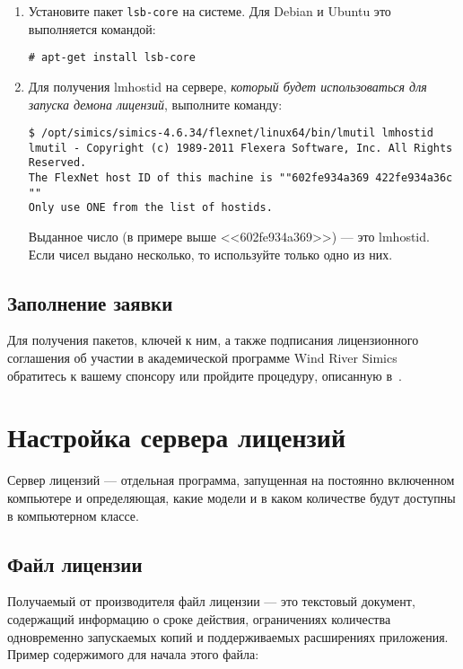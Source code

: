 \begin{enumerate}
    \item Установите пакет \texttt{lsb-core} на системе. Для Debian и Ubuntu это выполняется командой:
    
    \texttt{\# apt-get install lsb-core}
         
    \item Для получения lmhostid на сервере, \textit{который будет использоваться для запуска демона лицензий}, выполните команду:
    
\begin{lstlisting}
$ /opt/simics/simics-4.6.34/flexnet/linux64/bin/lmutil lmhostid
lmutil - Copyright (c) 1989-2011 Flexera Software, Inc. All Rights Reserved.
The FlexNet host ID of this machine is ""602fe934a369 422fe934a36c ""
Only use ONE from the list of hostids.
\end{lstlisting}

Выданное число (в примере выше <<602fe934a369>>) --- это lmhostid. Если чисел выдано несколько, то используйте только одно из них.
    
\end{enumerate}

\subsection{Заполнение заявки}

Для получения пакетов, ключей к ним, а также подписания лицензионного соглашения об участии в академической программе Wind River Simics обратитесь к вашему спонсору или пройдите процедуру, описанную в~\cite{engblom-academic-simics}.

\section{Настройка сервера лицензий}

Сервер лицензий --- отдельная программа, запущенная на постоянно включенном компьютере и определяющая, какие модели и в каком количестве будут доступны в компьютерном классе.

\subsection{Файл лицензии}

Получаемый от производителя файл лицензии --- это текстовый документ, содержащий информацию о сроке действия, ограничениях количества одновременно запускаемых копий и поддерживаемых расширениях приложения. Пример содержимого для начала этого файла:

